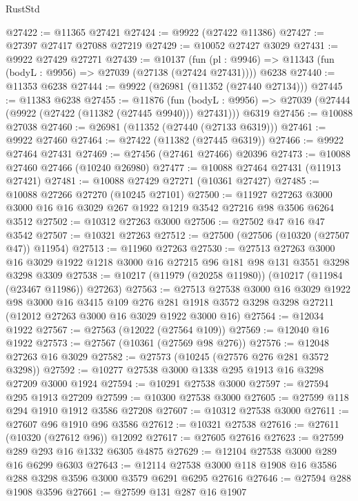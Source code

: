 \begin{lexlean}{RustStd}
\begin{coremodule}
@27422 := @11365 @27421
@27424 := @9922 (@27422 @11386)
@27427 := @27397 @27417 @27088 @27219
@27429 := @10052 @27427 @3029
@27431 := @9922 @27429 @27271
@27439 := @10137
    (fun (pl : @9946) => @11343 (fun (bodyL : @9956) => @27039 (@27138 (@27424 @27431))))
    @6238
@27440 := @11353 @6238
@27444 := @9922 (@26981 (@11352 (@27440 @27134)))
@27445 := @11383 @6238
@27455 := @11876
    (fun (bodyL : @9956) => @27039 (@27444 (@9922 (@27422 (@11382 (@27445 @9940))) @27431)))
    @6319
@27456 := @10088 @27038
@27460 := @26981 (@11352 (@27440 (@27133 @6319)))
@27461 := @9922 @27460
@27464 := @27422 (@11382 (@27445 @6319))
@27466 := @9922 @27464 @27431
@27469 := @27456 (@27461 @27466) @20396
@27473 := @10088 @27460 @27466 (@10240 @26980)
@27477 := @10088 @27464 @27431 (@11913 @27421)
@27481 := @10088 @27429 @27271 (@10361 @27427)
@27485 := @10088 @27266 @27270 (@10245 @27101)
@27500 := @11927
    @27263
    @3000
    @3000
    @16
    @16
    @3029
    @267
    @1922
    @1219
    @3542
    @27216
    @98
    @3506
    @6264
    @3512
@27502 := @10312 @27263 @3000
@27506 := @27502 @47 @16 @47 @3542
@27507 := @10321 @27263
@27512 := @27500 (@27506 (@10320 (@27507 @47)) @11954)
@27513 := @11960 @27263
@27530 := @27513
    @27263
    @3000
    @16
    @3029
    @1922
    @1218
    @3000
    @16
    @27215
    @96
    @181
    @98
    @131
    @3551
    @3298
    @3298
    @3309
@27538 := @10217 (@11979 (@20258 @11980)) (@10217 (@11984 (@23467 @11986)) @27263)
@27563 := @27513
    @27538
    @3000
    @16
    @3029
    @1922
    @98
    @3000
    @16
    @3415
    @109
    @276
    @281
    @1918
    @3572
    @3298
    @3298
    @27211
    (@12012 @27263 @3000 @16 @3029 @1922 @3000 @16)
@27564 := @12034 @1922
@27567 := @27563 (@12022 (@27564 @109))
@27569 := @12040 @16 @1922
@27573 := @27567 (@10361 (@27569 @98 @276))
@27576 := @12048 @27263 @16 @3029
@27582 := @27573 (@10245 (@27576 @276 @281 @3572 @3298))
@27592 := @10277 @27538 @3000 @1338 @295 @1913 @16 @3298 @27209 @3000 @1924
@27594 := @10291 @27538 @3000
@27597 := @27594 @295 @1913 @27209
@27599 := @10300 @27538 @3000
@27605 := @27599 @118 @294 @1910 @1912 @3586 @27208
@27607 := @10312 @27538 @3000
@27611 := @27607 @96 @1910 @96 @3586
@27612 := @10321 @27538
@27616 := @27611 (@10320 (@27612 @96)) @12092
@27617 := @27605 @27616
@27623 := @27599 @289 @293 @16 @1332 @6305 @4875
@27629 := @12104 @27538 @3000 @289 @16 @6299 @6303
@27643 := @12114 @27538 @3000 @118 @1908 @16 @3586 @288 @3298 @3596 @3000 @3579 @6291 @6295 @27616
@27646 := @27594 @288 @1908 @3596
@27661 := @27599
    @131
    @287
    @16
    @1907

\end{coremodule}
\end{lexlean}
